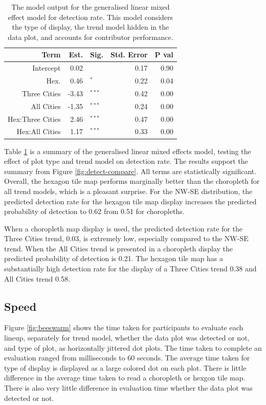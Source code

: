 \documentclass[conference,final,]{IEEEtran}
\begin{document}
\begin{table}

\caption{\label{tab:detect-glmer1}The model output for the generalised linear mixed effect model for detection rate. This model considers the type of display, the trend model hidden in the data plot, and accounts for contributor performance.}
\centering
\begin{tabular}[t]{rrlrr}
\toprule
Term & Est. & Sig. & Std. Error & P val\\
\midrule
Intercept & 0.02 & $^{ }$ & 0.17 & 0.90\\
Hex. & 0.46 & $^{*}$ & 0.22 & 0.04\\
\addlinespace
Three Cities & -3.43 & $^{***}$ & 0.42 & 0.00\\
All Cities & -1.35 & $^{***}$ & 0.24 & 0.00\\
\addlinespace
Hex:Three Cities & 2.46 & $^{***}$ & 0.47 & 0.00\\
Hex:All Cities & 1.17 & $^{***}$ & 0.33 & 0.00\\
\bottomrule
\end{tabular}
\end{table}

Table \ref{tab:detect-glmer1} is a summary of the generalised linear mixed effects model, testing the effect of plot type and trend model on detection rate. The results support the summary from Figure \ref{fig:detect-compare}. All terms are statistically significant. Overall, the hexagon tile map performs marginally better than the choropleth for all trend models, which is a pleasant surprise.
For the NW-SE distribution, the predicted detection rate for the hexagon tile map display increases the predicted probability of detection to 0.62 from 0.51 for choropleths.

When a choropleth map display is used, the predicted detection rate for the Three Cities trend, 0.03, is extremely low, especially compared to the NW-SE trend. When the All Cities trend is presented in a choropleth display the predicted probability of detection is 0.21. The hexagon tile map has a substantially high detection rate for the display of a Three Cities trend 0.38 and All Cities trend 0.58.

\hypertarget{speed}{%
\subsection{Speed}\label{speed}}

Figure \ref{fig:beeswarm} shows the time taken for participants to evaluate each lineup, separately for trend model, whether the data plot was detected or not, and type of plot, as horizontally jittered dot plots. The time taken to complete an evaluation ranged from milliseconds to 60 seconds. The average time taken for type of display is displayed as a large colored dot on each plot. There is little difference in the average time taken to read a choropleth or hexgon tile map. There is also very little difference in evaluation time whether the data plot was detected or not.
\end{document}
